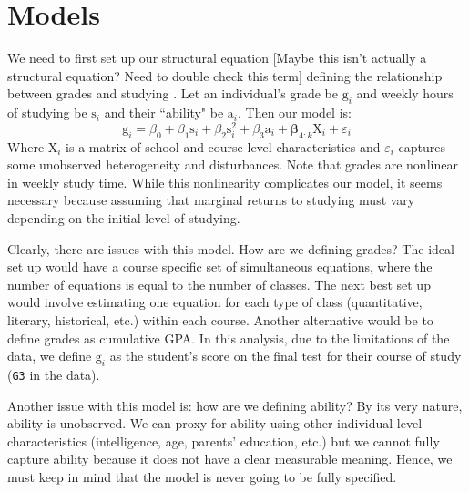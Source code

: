 \documentclass[12pt]{article}
\newcommand{\inlinecode}{\texttt}
\begin{document}
\section{Models}
We need to first set up our structural equation \textcolor{BrickRed}{[Maybe this isn't actually a structural equation? Need to double check this term]} defining the relationship between grades and studying \citep{CardKrueger}. Let an individual's grade be $\mathrm{g}_i$ and weekly hours of studying be $\mathrm{s}_i$ and their ``ability" be $\mathrm{a}_i$. Then our model is:
$$
\mathrm{g}_i = \beta_0 + \beta_1 \mathrm{s}_i + \beta_2 \mathrm{s}_i^2  + \beta_3 \mathrm{a}_i + \boldsymbol{\beta}_{4:k}\mathrm{X}_i + \varepsilon_i
$$
Where X$_i$ is a matrix of school and course level characteristics and $\varepsilon_i$ captures some unobserved heterogeneity and disturbances. Note that grades are nonlinear in weekly study time. While this nonlinearity complicates our model, it seems necessary because assuming that marginal returns to studying must vary depending on the initial level of studying.

Clearly, there are issues with this model. How are we defining grades? The ideal set up would have a course specific set of simultaneous equations, where the number of equations is equal to the number of classes. The next best set up would involve estimating one equation for each type of class (quantitative, literary, historical, etc.) within each course. Another alternative would be to define grades as cumulative GPA. In this analysis, due to the limitations of the data, we define $\mathrm{g}_i$ as the student's score on the final test for their course of study (\inlinecode{G3} in the data).

Another issue with this model is: how are we defining ability? By its very nature, ability is unobserved. We can proxy for ability using other individual level characteristics (intelligence, age, parents' education, etc.) but we cannot fully capture ability because it does not have a clear measurable meaning. Hence, we must keep in mind that the model is never going to be fully specified.
\end{document}
